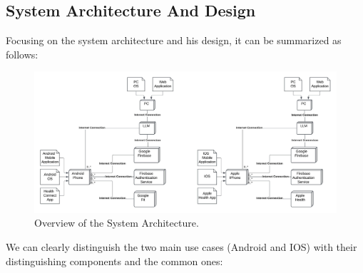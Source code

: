 \subsection{System Architecture And Design}
Focusing on the system architecture and his design, it can be summarized as follows:
\begin{figure}
    \includegraphics[width=1.0\linewidth]{./images/system_architecture.jpeg}
    \caption{Overview of the System Architecture.}
    \label{fig:systemArchitecture}
\end{figure}

\noindent We can clearly distinguish the two main use cases (Android and IOS) with their distinguishing components and the common ones:

